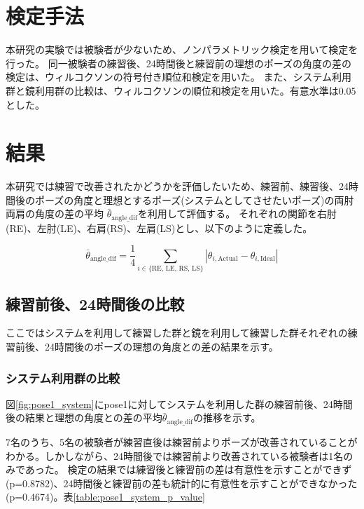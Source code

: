 \section{検定手法}
  本研究の実験では被験者が少ないため、ノンパラメトリック検定を用いて検定を行った。
  同一被験者の練習後、24時間後と練習前の理想のポーズの角度の差の検定は、ウィルコクソンの符号付き順位和検定を用いた。
  また、システム利用群と鏡利用群の比較は、ウィルコクソンの順位和検定を用いた。有意水準は0.05とした。
\section{結果}
  本研究では練習で改善されたかどうかを評価したいため、練習前、練習後、24時間後のポーズの角度と理想とするポーズ(システムとしてさせたいポーズ)の両肘両肩の角度の差の平均 \(\bar{\theta}_{\text{angle\_dif}}\)を利用して評価する。
  それぞれの関節を右肘(RE)、左肘(LE)、右肩(RS)、左肩(LS)とし、以下のように定義した。

  \[
    \bar{\theta}_{\text{angle\_dif}} = \frac{1}{4} \sum_{i \in \{\text{RE, LE, RS, LS}\}} |\theta_{i, \text{Actual}} - \theta_{i, \text{Ideal}}|
  \]

  \subsection{練習前後、24時間後の比較}
    ここではシステムを利用して練習した群と鏡を利用して練習した群それぞれの練習前後、24時間後のポーズの理想の角度との差の結果を示す。
    \subsubsection{システム利用群の比較}
      図\ref{fig:pose1_system}にpose1に対してシステムを利用した群の練習前後、24時間後の結果と理想の角度との差の平均\(\bar{\theta}_{\text{angle\_dif}}\)の推移を示す。


      7名のうち、5名の被験者が練習直後は練習前よりポーズが改善されていることがわかる。しかしながら、24時間後では練習前より改善されている被験者は1名のみであった。
      検定の結果では練習後と練習前の差は有意性を示すことができず(p=0.8782)、24時間後と練習前の差も統計的に有意性を示すことができなかった(p=0.4674)。表\ref{table:pose1_system_p_value}


